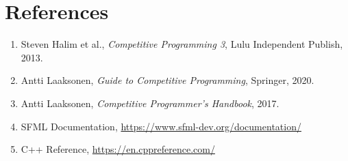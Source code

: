\documentclass[12pt,a4paper]{article}
\begin{document}
\section{References}
\begin{enumerate}
    \item Steven Halim et al., \textit{Competitive Programming 3}, Lulu Independent Publish, 2013.
    \item Antti Laaksonen, \textit{Guide to Competitive Programming}, Springer, 2020.
    \item Antti Laaksonen, \textit{Competitive Programmer's Handbook}, 2017.
    \item SFML Documentation, \url{https://www.sfml-dev.org/documentation/}
    \item C++ Reference, \url{https://en.cppreference.com/}
\end{enumerate}
\end{document}
